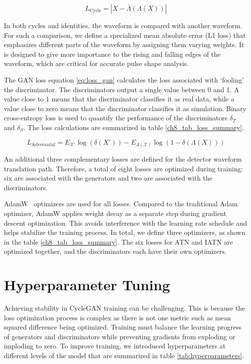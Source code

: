 \begin{equation}\label{eq:loss_cyc}
    L_{\mathrm{Cycle}} = |X - \bar{\Lambda}(\Lambda(X))|
\end{equation}

In both cycles and identities, the waveform is compared with another waveform. For such a comparison, we define a specialized mean absolute error (L1 loss) that emphasizes different parts of the waveform by assigning them varying weights. It is designed to give more importance to the rising and falling edges of the waveform, which are critical for accurate pulse shape analysis.

The GAN loss equation \ref{eq:loss_gan} calculates the loss associated with `fooling' the discriminator.  The discriminators output a single value between 0 and 1. A value close to 1 means that the discriminator classifies it as real data, while a value close to zero means that the discriminator classifies it as simulation. Binary cross-entropy loss is used to quantify the performance of the discriminators $\delta_{T}$ and $\delta_{S}$. The loss calculations are summarized in table \ref{ch8_tab_loss_summary}.

\begin{equation}\label{eq:loss_gan}
    L_{\mathrm{Adversarial}} = E_{\mathcal{X'}}\log(\delta(X')) - E_{\Lambda(\mathcal{X})}\log(1 - \delta(\Lambda(X)))
\end{equation}

An additional three complementary losses are defined for the detector waveform translation path. Therefore, a total of eight losses are optimized during training: six are associated with the generators and two are associated with the discriminators.



AdamW~\cite{adam_w_paper} optimizers are used for all losses. Compared to the traditional Adam optimizer, AdamW applies weight decay as a separate step during gradient descent optimization. This avoids interference with the learning rate schedule and helps stabilize the training process. In total, we define three optimizers, as shown in the table \ref{ch8_tab_loss_summary}. The six losses for ATN and IATN are optimized together, and the discriminators each have their own optimizers.

\section{Hyperparameter Tuning}
Achieving stability in CycleGAN training can be challenging. This is because the loss optimization process is complex as there is not one metric such as mean squared difference being optimized. Training must balance the learning progress of generators and discriminators while preventing gradients from exploding or imploding to zero. To improve training, we introduced hyperparameters at different levels of the model that are summarized in table \ref{tab:hyperparameters}.

